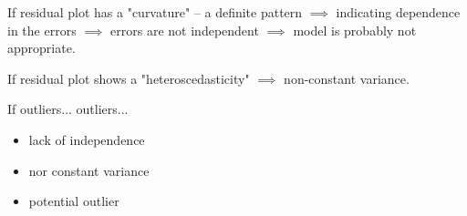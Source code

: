 \documentclass[a4paper, 11pt, twoside]{article}
\begin{document}
 If residual plot has a "curvature" -- a definite pattern $\implies$ indicating dependence in the errors $\implies$ errors are not independent $\implies$ model is probably not appropriate.
 
 If residual plot shows a "heteroscedasticity" $\implies$ non-constant variance.
 
 If outliers... outliers...
 
\begin{itemize}
	\item lack of independence
	\item nor constant variance
	\item potential outlier
\end{itemize}
\end{document}
